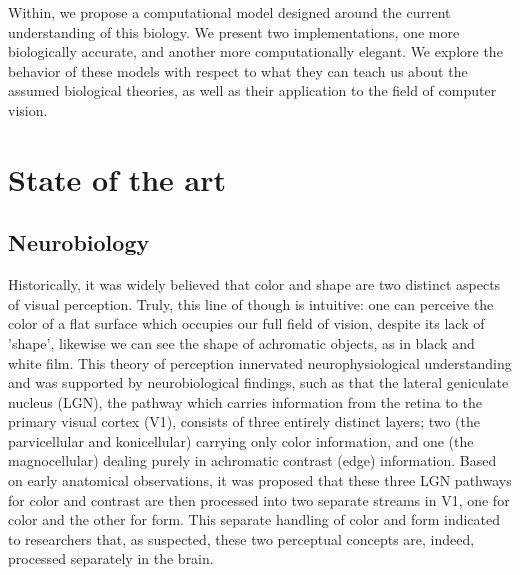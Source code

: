 \documentclass[journal,onecolumn]{IEEEtran}
\begin{document}
Within, we propose a computational model designed around the current understanding of this biology. We present two implementations, one more biologically accurate, and another more computationally elegant. We explore the behavior of these models with respect to what they can teach us about the assumed biological theories, as well as their application to the field of computer vision.


%
%
%
\section{State of the art}


\subsection{Neurobiology}

Historically, it was widely believed that color and shape are two distinct aspects of visual perception. Truly, this line of though is intuitive: one can perceive the color of a flat surface which occupies our full field of vision, despite its lack of 'shape', likewise we can see the shape of achromatic objects, as in black and white film. This theory of perception innervated neurophysiological understanding and was supported by neurobiological findings, such as that the lateral geniculate nucleus (LGN), the pathway which carries information from the retina to the primary visual cortex (V1), consists of three entirely distinct layers; two (the parvicellular and konicellular) carrying only color information, and one (the magnocellular) dealing purely in achromatic contrast (edge) information. Based on early anatomical observations, it was proposed that these three LGN pathways for color and contrast are then processed into two separate streams in V1, one for color and the other for form. This separate handling of color and form indicated to researchers that, as suspected, these two perceptual concepts are, indeed, processed separately in the brain.
\end{document}
